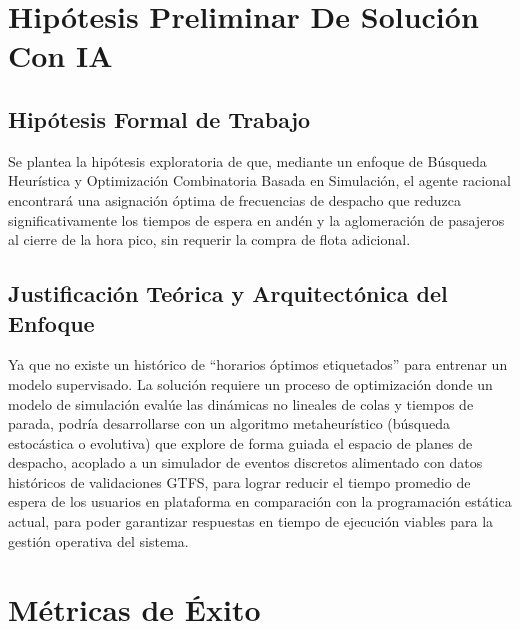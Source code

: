 \documentclass{article}
\begin{document}
\section{Hipótesis Preliminar De Solución Con IA}


\subsection{Hipótesis Formal de Trabajo}

Se plantea la hipótesis exploratoria de que, mediante un enfoque de Búsqueda Heurística y Optimización Combinatoria Basada en Simulación, el agente racional encontrará una asignación óptima de frecuencias de despacho que reduzca significativamente los tiempos de espera en andén y la aglomeración de pasajeros al cierre de la hora pico, sin requerir la compra de flota adicional.

\subsection{Justificación Teórica y Arquitectónica del Enfoque}

Ya que no existe un histórico de ``horarios óptimos etiquetados'' para entrenar un modelo supervisado. La solución requiere un proceso de optimización donde un modelo de simulación evalúe las dinámicas no lineales de colas y tiempos de parada, podría desarrollarse con un algoritmo metaheurístico (búsqueda estocástica o evolutiva) que explore de forma guiada el espacio de planes de despacho, acoplado a un simulador de eventos discretos alimentado con datos históricos de validaciones GTFS, para lograr reducir el tiempo promedio de espera de los usuarios en plataforma en comparación con la programación estática actual, para poder garantizar respuestas en tiempo de ejecución viables para la gestión operativa del sistema.


\section{Métricas de Éxito}
\end{document}
